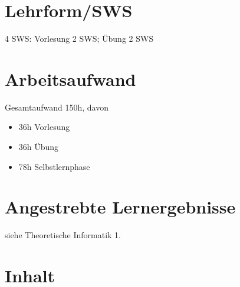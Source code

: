 \hypertarget{lehrformswspathlabelmi-2017modulbeschreibungen-bachelorba_theoretischeinformatik2}{%
\section*{Lehrform/SWS\label{/mi-2017/modulbeschreibungen-bachelor/BA_TheoretischeInformatik2}}\label{lehrformswspathlabelmi-2017modulbeschreibungen-bachelorba_theoretischeinformatik2}}

4 SWS: Vorlesung 2 SWS; Übung 2 SWS

\hypertarget{arbeitsaufwandpathlabelmi-2017modulbeschreibungen-bachelorba_theoretischeinformatik2}{%
\section*{Arbeitsaufwand\label{/mi-2017/modulbeschreibungen-bachelor/BA_TheoretischeInformatik2}}\label{arbeitsaufwandpathlabelmi-2017modulbeschreibungen-bachelorba_theoretischeinformatik2}}

Gesamtaufwand 150h, davon

\begin{itemize}
\tightlist
\item
  36h Vorlesung
\item
  36h Übung
\item
  78h Selbstlernphase
\end{itemize}

\hypertarget{angestrebte-lernergebnissepathlabelmi-2017modulbeschreibungen-bachelorba_theoretischeinformatik2}{%
\section*{Angestrebte
Lernergebnisse\label{/mi-2017/modulbeschreibungen-bachelor/BA_TheoretischeInformatik2}}\label{angestrebte-lernergebnissepathlabelmi-2017modulbeschreibungen-bachelorba_theoretischeinformatik2}}

siehe Theoretische Informatik 1.

\hypertarget{inhaltpathlabelmi-2017modulbeschreibungen-bachelorba_theoretischeinformatik2}{%
\section*{Inhalt\label{/mi-2017/modulbeschreibungen-bachelor/BA_TheoretischeInformatik2}}\label{inhaltpathlabelmi-2017modulbeschreibungen-bachelorba_theoretischeinformatik2}}

